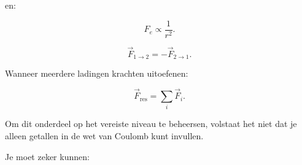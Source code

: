 \documentclass{ximera}
\begin{document}
en:

\[
\boxed{
F_e\propto\frac1{r^2}.
}
\]



\[
\boxed{
\vec F_{1\rightarrow2}
=
-\vec F_{2\rightarrow1}.
}
\]



Wanneer meerdere ladingen krachten uitoefenen:

\[
\boxed{
\vec F_\mathrm{res}
=
\sum_i\vec F_i.
}
\]




Om dit onderdeel op het vereiste niveau te beheersen, volstaat het
niet dat je alleen getallen in de wet van Coulomb kunt invullen.

Je moet zeker kunnen:
\end{document}
